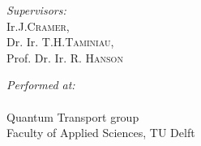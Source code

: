 \documentclass[a4paper,10pt]{report}
\begin{document}
\begin{minipage}{0.5\textwidth}
\begin{flushleft} \large
\emph{Supervisors:}\\
Ir.J.\textsc{Cramer}, \\
Dr. Ir. T.H.\textsc{Taminiau}, \\
Prof. Dr. Ir. R. \textsc{Hanson}
\end{flushleft}
\end{minipage}
\begin{minipage}{0.5\textwidth}
\begin{flushright} \large
\emph{Performed at:} \\
\quad \\
Quantum Transport group \\
Faculty of Applied Sciences, TU Delft
\end{flushright}
\end{minipage}





\normalsize

\newpage
\end{document}
